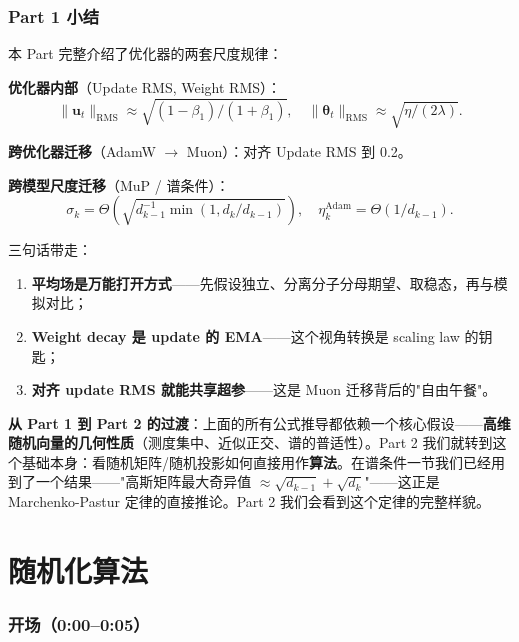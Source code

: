 \documentclass[11pt,a4paper]{ctexart}
\theoremstyle{definition}
\theoremstyle{remark}
\newcommand{\RMS}{\mathrm{RMS}}
\newcommand{\bigT}{\Theta}
\begin{document}
\section{Part 1 小结}
 
本 Part 完整介绍了优化器的两套尺度规律：
 
\textbf{优化器内部}（Update RMS, Weight RMS）：
\[
\|\bm{u}_t\|_\RMS \approx \sqrt{(1-\beta_1)/(1+\beta_1)}, \quad \|\bm{\theta}_t\|_\RMS \approx \sqrt{\eta/(2\lambda)}.
\]
 
\textbf{跨优化器迁移}（AdamW $\to$ Muon）：对齐 Update RMS 到 0.2。
 
\textbf{跨模型尺度迁移}（MuP / 谱条件）：
\[
\sigma_k = \bigT\!\left(\sqrt{d_{k-1}^{-1}\min(1, d_k/d_{k-1})}\right), \quad \eta_k^\text{Adam} = \bigT(1/d_{k-1}).
\]
 
三句话带走：
\begin{enumerate}
    \item \textbf{平均场是万能打开方式}——先假设独立、分离分子分母期望、取稳态，再与模拟对比；
    \item \textbf{Weight decay 是 update 的 EMA}——这个视角转换是 scaling law 的钥匙；
    \item \textbf{对齐 update RMS 就能共享超参}——这是 Muon 迁移背后的"自由午餐"。
\end{enumerate}
 
\begin{keyinsight}
\textbf{从 Part 1 到 Part 2 的过渡}：上面的所有公式推导都依赖一个核心假设——\textbf{高维随机向量的几何性质}（测度集中、近似正交、谱的普适性）。Part 2 我们就转到这个基础本身：看随机矩阵/随机投影如何直接用作\textbf{算法}。在谱条件一节我们已经用到了一个结果——"高斯矩阵最大奇异值 $\approx \sqrt{d_{k-1}} + \sqrt{d_k}$"——这正是 Marchenko-Pastur 定律的直接推论。Part 2 我们会看到这个定律的完整样貌。
\end{keyinsight}
 
\newpage

\part{随机化算法}

\section{开场（0:00--0:05）}
\end{document}
